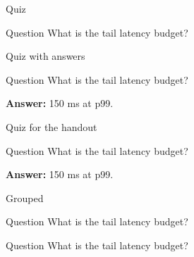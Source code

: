 
\begin{frame}{Quiz}

\begin{block}{Question}
What is the tail latency budget?

\end{block}
\end{frame}

\begin{frame}{Quiz with answers}

\begin{block}{Question}
What is the tail latency budget?

\textbf{Answer:} 150 ms at p99.
\end{block}
\end{frame}

\begin{frame}{Quiz for the handout}

\begin{block}{Question}
What is the tail latency budget?

\textbf{Answer:} 150 ms at p99.
\end{block}
\end{frame}

\begin{frame}{Grouped}
{%
\small

\begin{block}{Question}
What is the tail latency budget?

\end{block}
}
\end{frame}


\begin{block}{Question}
What is the tail latency budget?

\end{block}
